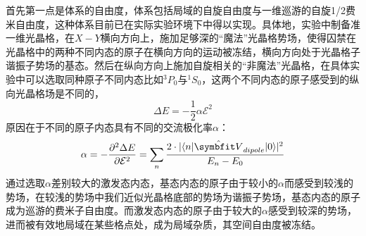 首先第一点是体系的自由度，体系包括局域的自旋自由度与一维巡游的自旋1/2费米自由度，这种体系目前已在实际实验环境下中得以实现\cite{riegger2018localized}。具体地，实验中制备准一维光晶格，在$X-Y$横向方向上，施加足够深的“魔法”光晶格势场，使得囚禁在光晶格中的两种不同内态的原子在横向方向的运动被冻结，横向方向处于光晶格子谐振子势场的基态。然后在纵向方向上施加自旋相关的“非魔法”光晶格，在具体实验中可以选取同种原子不同内态比如${}^3P_0$与${}^1S_0$，这两个不同内态的原子感受到的纵向光晶格场是不同的，
\begin{equation}
    \Delta E = -\frac{1}{2}\alpha\mathcal{E}^2
\end{equation}
原因在于不同的原子内态具有不同的交流极化率$\alpha$：
\begin{equation}
\alpha = -\frac{\partial^2\Delta E}{\partial \mathcal{E}^2} = \sum_{n} \frac{2\cdot|\langle n|\hat{\Vector{V}}_{dipole}|0\rangle|^2}{E_n-E_0}
\end{equation}
通过选取$\alpha$差别较大的激发态内态，基态内态的原子由于较小的$\alpha$而感受到较浅的势场，在较浅的势场中我们近似光晶格底部的势场为谐振子势场，基态内态的原子成为巡游的费米子自由度。而激发态内态的原子由于较大的$\alpha$感受到较深的势场，进而被有效地局域在某些格点处，成为局域杂质，其空间自由度被冻结。

